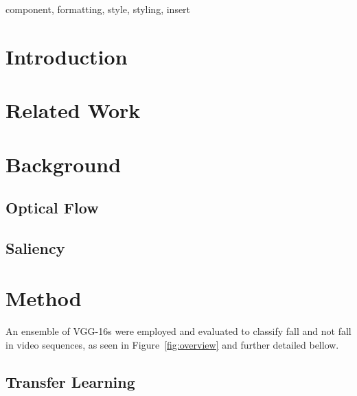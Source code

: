 \documentclass[conference]{IEEEtran}
\begin{document}
\begin{IEEEkeywords}
component, formatting, style, styling, insert
\end{IEEEkeywords}

\section{Introduction}

\section{Related Work}

\section{Background}

\subsection{Optical Flow}

\subsection{Saliency}

\section{Method}

An ensemble of VGG-16s were employed and evaluated to classify fall and not fall in video sequences, as seen in Figure~\ref{fig:overview} and further detailed bellow.


\subsection{Transfer Learning}
\end{document}
